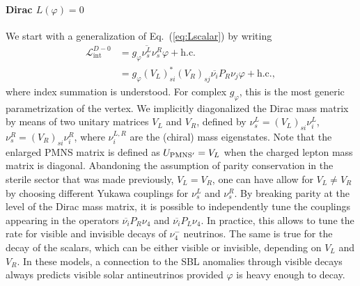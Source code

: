 \documentclass[
reprint,
superscriptaddress,
showpacs,
preprintnumbers,
nofootinbib,
nobibnotes,
amsmath,
amssymb, 
aps,
prd,
floatfix
]{revtex4-1}
\newcommand{\refeq}[1]{Eq.~(\ref{#1})}
\renewcommand{\phi}{\varphi}
\begin{document}
\paragraph{Dirac $L(\phi)=0$} We start with a generalization of \refeq{eq:Lscalar} by writing
\begin{align}\label{eq:LD0}
     \mathscr{L}_{\text{int}}^{D-0} &= g_\phi \overline{\nu^L_s}\nu^R_s\phi + \text{h.c.} 
     \\\nonumber
     &= g_\phi (V_L)_{si}^*(V_R)_{sj} \overline{\nu_i}P_R\nu_j \phi + \text{h.c.},
\end{align}
where index summation is understood. For complex $g_\phi$, this is the most generic parametrization of the vertex. We implicitly diagonalized the Dirac mass matrix by means of two unitary matrices $V_L$ and $V_R$, defined by $\nu^L_{s} = (V_{L})_{si} \nu^L_i$, $\nu^R_s = (V_{R})_{si} \nu_i^R$, where $\nu_i^{L,R}$ are the (chiral) mass eigenstates. Note that the enlarged PMNS matrix is defined as $U_{\rm PMNS^\prime} = V_L$ when the charged lepton mass matrix is diagonal. Abandoning the assumption of parity conservation in the sterile sector that was made previously, $V_L=V_R$, one can have allow for $V_L \neq V_R$ by choosing different Yukawa couplings for $\nu_s^L$ and $\nu_s^R$. By breaking parity at the level of the Dirac mass matrix, it is possible to independently tune the couplings appearing in the operators $\overline{\nu_i} P_R \nu_4$ and $\overline{\nu_i}P_L\nu_4$. In practice, this allows to tune the rate for visible and invisible decays of $\nu_4^-$ neutrinos. The same is true for the decay of the scalars, which can be either visible or invisible, depending on $V_L$ and $V_R$. In these models, a connection to the SBL anomalies through visible decays always predicts visible solar antineutrinos provided $\phi$ is heavy enough to decay.
\end{document}
